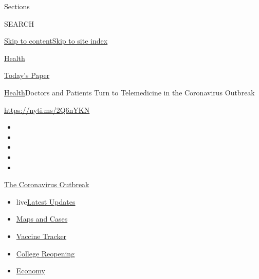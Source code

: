 Sections

SEARCH

\protect\hyperlink{site-content}{Skip to
content}\protect\hyperlink{site-index}{Skip to site index}

\href{https://www.nytimes.com/section/health}{Health}

\href{https://myaccount.nytimes.com/auth/login?response_type=cookie\&client_id=vi}{}

\href{https://www.nytimes.com/section/todayspaper}{Today's Paper}

\href{/section/health}{Health}\textbar{}Doctors and Patients Turn to
Telemedicine in the Coronavirus Outbreak

\url{https://nyti.ms/2Q6nYKN}

\begin{itemize}
\item
\item
\item
\item
\item
\end{itemize}

\href{https://www.nytimes.com/news-event/coronavirus?action=click\&pgtype=Article\&state=default\&region=TOP_BANNER\&context=storylines_menu}{The
Coronavirus Outbreak}

\begin{itemize}
\tightlist
\item
  live\href{https://www.nytimes.com/2020/08/04/world/coronavirus-covid-19.html?action=click\&pgtype=Article\&state=default\&region=TOP_BANNER\&context=storylines_menu}{Latest
  Updates}
\item
  \href{https://www.nytimes.com/interactive/2020/us/coronavirus-us-cases.html?action=click\&pgtype=Article\&state=default\&region=TOP_BANNER\&context=storylines_menu}{Maps
  and Cases}
\item
  \href{https://www.nytimes.com/interactive/2020/science/coronavirus-vaccine-tracker.html?action=click\&pgtype=Article\&state=default\&region=TOP_BANNER\&context=storylines_menu}{Vaccine
  Tracker}
\item
  \href{https://www.nytimes.com/2020/08/02/us/covid-college-reopening.html?action=click\&pgtype=Article\&state=default\&region=TOP_BANNER\&context=storylines_menu}{College
  Reopening}
\item
  \href{https://www.nytimes.com/live/2020/08/03/business/stock-market-today-coronavirus?action=click\&pgtype=Article\&state=default\&region=TOP_BANNER\&context=storylines_menu}{Economy}
\end{itemize}

